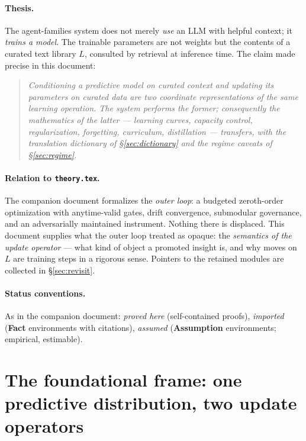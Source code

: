 \documentclass[11pt]{article}
\theoremstyle{plain}
\theoremstyle{definition}
\theoremstyle{remark}
\begin{document}
\paragraph{Thesis.} The agent-families system does not merely \emph{use} an
LLM with helpful context; it \emph{trains a model}. The trainable parameters
are not weights but the contents of a curated text library $L$, consulted by
retrieval at inference time. The claim made precise in this document:
\begin{quote}\itshape
Conditioning a predictive model on curated context and updating its
parameters on curated data are two coordinate representations of the same
learning operation. The system performs the former; consequently the
mathematics of the latter --- learning curves, capacity control,
regularization, forgetting, curriculum, distillation --- transfers, with the
translation dictionary of \S\ref{sec:dictionary} and the regime caveats of
\S\ref{sec:regime}.
\end{quote}

\paragraph{Relation to \texttt{theory.tex}.} The companion document
formalizes the \emph{outer loop}: a budgeted zeroth-order optimization with
anytime-valid gates, drift convergence, submodular governance, and an
adversarially maintained instrument. Nothing there is displaced. This
document supplies what the outer loop treated as opaque: the
\emph{semantics of the update operator} --- what kind of object a promoted
insight is, and why moves on $L$ are training steps in a rigorous sense.
Pointers to the retained modules are collected in \S\ref{sec:revisit}.

\paragraph{Status conventions.} As in the companion document:
\emph{proved here} (self-contained proofs), \emph{imported}
(\textbf{Fact} environments with citations), \emph{assumed}
(\textbf{Assumption} environments; empirical, estimable).

\section{The foundational frame: one predictive distribution, two update
operators}\label{sec:frame}
\end{document}
